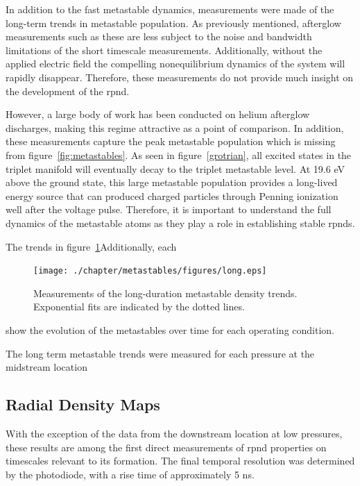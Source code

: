 In addition to the fast metastable dynamics, measurements were made of the
long-term trends in metastable population. As previously mentioned, afterglow
measurements such as these are less subject to the noise and bandwidth
limitations of the short timescale measurements. Additionally, without the
applied electric field the compelling nonequilibrium dynamics of the system will
rapidly disappear. Therefore, these measurements do not provide much insight on
the development of the \acs{rpnd}.

However, a large body of work has been conducted on helium afterglow discharges,
making this regime attractive as a point of comparison. In addition, these
measurements capture the peak metastable population which is missing from
figure~\ref{fig:metastables}. As seen in figure~\ref{grotrian}, all excited
states in the triplet manifold will eventually decay to the triplet metastable
level. At 19.6 eV above the ground state, this large metastable population
provides a long-lived energy source that can produced charged particles through
Penning ionization well after the voltage pulse. Therefore, it is important to
understand the full dynamics of the metastable atoms as they play a role in
establishing stable \acs{rpnd}s.

The trends in figure~\ref{fig:long}Additionally, each
\begin{figure}
  \centering
  \texttt{[image: ./chapter/metastables/figures/long.eps]}
  \caption{Measurements of the long-duration metastable density trends.
  Exponential fits are indicated by the dotted lines.}
  \label{fig:long}
\end{figure}
show the evolution of the metastables over time for each operating condition.


The long term metastable trends were measured for each pressure at the midstream
location


\subsection{Radial Density Maps}



With the exception of the data from the downstream location at low pressures,
these results are among the first direct measurements of \acs{rpnd} properties
on timescales relevant to its formation. The final temporal resolution was
determined by the photodiode, with a rise time of approximately 5 ns. 
